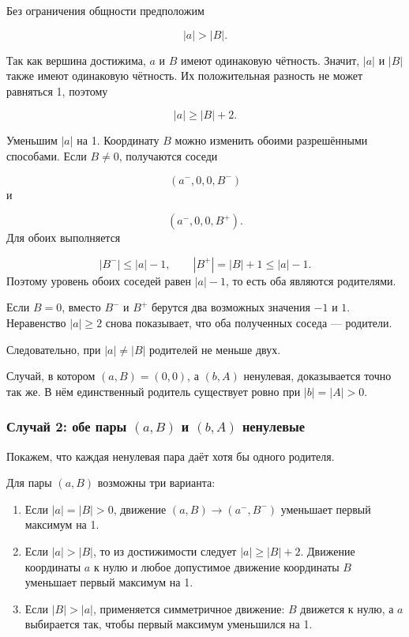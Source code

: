 Без ограничения общности предположим

$$
|a|>|B|.
$$

Так как вершина достижима, $a$ и $B$ имеют одинаковую чётность. Значит,
$|a|$ и $|B|$ также имеют одинаковую чётность. Их положительная разность
не может равняться 1, поэтому

$$
|a| \ge |B|+2.
$$

Уменьшим $|a|$ на 1. Координату $B$ можно изменить обоими разрешёнными
способами. Если $B \ne 0$, получаются соседи

$$(a^{-},0,0,B^{-})
$$
и

$$(a^{-},0,0,B^{+}).
$$
Для обоих выполняется

$$|B^{-}|\le |a|-1,
\qquad
|B^{+}|=|B|+1\le |a|-1.
$$
Поэтому уровень обоих соседей равен $|a|-1$, то есть оба являются
родителями.

Если $B=0$, вместо $B^{-}$ и $B^{+}$ берутся два возможных значения $-1$ и
$1$. Неравенство $|a| \ge 2$ снова показывает, что оба полученных соседа ---
родители.

Следовательно, при $|a| \ne |B|$ родителей не меньше двух.

Случай, в котором $(a,B)=(0,0)$, а $(b,A)$ ненулевая, доказывается точно
так же. В нём единственный родитель существует ровно при $|b|=|A|>0$.

\subsubsection{\texorpdfstring{Случай 2: обе пары $(a,B)$ и $(b,A)$ ненулевые}{Случай 2: обе пары (a,B) и (b,A) ненулевые}}

Покажем, что каждая ненулевая пара даёт хотя бы одного родителя.

Для пары $(a,B)$ возможны три варианта:

\begin{enumerate}
\def\labelenumi{\arabic{enumi}.}
\tightlist
\item
  Если $|a|=|B|>0$, движение $(a,B)\to(a^{-},B^{-})$ уменьшает первый максимум
  на 1.
\item
  Если $|a|>|B|$, то из достижимости следует $|a| \ge |B|+2$. Движение
  координаты $a$ к нулю и любое допустимое движение координаты $B$
  уменьшает первый максимум на 1.
\item
  Если $|B|>|a|$, применяется симметричное движение: $B$ движется к
  нулю, а $a$ выбирается так, чтобы первый максимум уменьшился на 1.
\end{enumerate}

